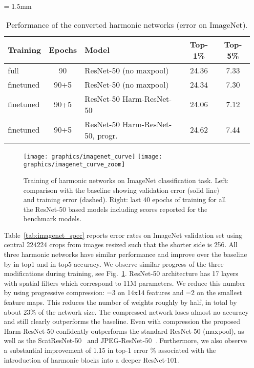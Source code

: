 \documentclass[12pt,a4paper]{article}
\begin{document}
\begin{table}[h]
\caption{Performance of the converted harmonic networks (error on ImageNet).} 
\label{tab:imagenet_spec2}
\vspace{0.3\baselineskip}
\small
\centering
\tabcolsep = 1.5mm
\begin{tabular}{ lclcc }
\hline
\textbf{Training} & \textbf{Epochs} & \textbf{Model} & \textbf{Top-1\%} & \textbf{Top-5\%} \\
\hline
full & 90 & ResNet-50 (no maxpool) & 24.36 & 7.33 \\
finetuned & 90+5 & ResNet-50 (no maxpool) & 24.34 & 7.30 \\
\hline
finetuned & 90+5 & ResNet-50\,\,Harm-ResNet-50 & 24.06 & 7.12 \\
finetuned & 90+5 & ResNet-50\,\,Harm-ResNet-50, progr.  & 24.62 & 7.44 \\
\hline
\end{tabular}
\end{table}


\begin{figure}[h]
\begin{center}
   \texttt{[image: graphics/imagenet\_curve]}\;\;
   \texttt{[image: graphics/imagenet\_curve\_zoom]}
\end{center}
\vspace{-.5\baselineskip}
   \caption{Training of harmonic networks on ImageNet classification task. Left: comparison with the baseline showing validation error (solid line) and training error (dashed). Right: last 40 epochs of training for all the ResNet-50 based models including scores reported for the benchmark models.
   }
\label{fig:imagenet_curve}
\end{figure}

Table~\ref{tab:imagenet_spec} reports error rates on ImageNet validation set using central 224224 crops from images resized such that the shorter side is 256.
All three harmonic networks have similar performance and improve over the baseline by  in top1 and  in top5 accuracy. We observe similar progress of the three modifications during training, see Fig.~\ref{fig:imagenet_curve}. ResNet-50 architecture has 17 layers with spatial filters which correspond to 11M parameters. We reduce this number by using progressive  compression: =3 on 14x14 features and =2 on the smallest feature maps. This reduces the number of weights roughly by half, in total by about 23\% of the network size. The compressed network loses almost no accuracy and still clearly outperforms the baseline.
Even with compression the proposed Harm-ResNet-50 confidently outperforms the standard ResNet-50 (maxpool), as well as the ScatResNet-50~\cite{Oyallon18b} and JPEG-ResNet-50~\cite{Gueguen18}.
Furthermore, we also observe a substantial improvement of 1.15 in top-1 error \% associated with the introduction of harmonic blocks into a deeper ResNet-101. 
\end{document}
